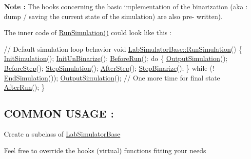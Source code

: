 {\bfseries Note \+:} The hooks concerning the basic implementation of the binarization (aka \+: dump / saving the current state of the simulation) are also pre-\/ written).

The inner code of \hyperlink{classelps_1_1_lab_simulator_base_ab48e943c2b85b25ff96b2aab4d9aa4bd}{Run\+Simulation()} could look like this \+:


\begin{DoxyCode}
\textcolor{comment}{// Default simulation loop behavior}
\textcolor{keywordtype}{void} \hyperlink{classelps_1_1_lab_simulator_base_ab48e943c2b85b25ff96b2aab4d9aa4bd}{LabSimulatorBase::RunSimulation}()
\{
\hyperlink{classelps_1_1_lab_simulator_base_aa14aa05df8173ffd2a2e67aa25f3cea5}{InitSimulation}();
\hyperlink{classelps_1_1_lab_simulator_base_a1339bc2fd37e7a4cc5c8792f447bf348}{InitUnBinarize}();
\hyperlink{classelps_1_1_lab_simulator_base_abf0012f53b199184d9359656f2f9e4e1}{BeforeRun}();
\textcolor{keywordflow}{do}
\{
        \hyperlink{classelps_1_1_lab_simulator_base_ac0c49279bf16f19b4f8fbd856e3fc6d6}{OutputSimulation}();
        \hyperlink{classelps_1_1_lab_simulator_base_a51232753515304871678d22aea555a8b}{BeforeStep}();
        \hyperlink{classelps_1_1_lab_simulator_base_ab48b05171894c3405e6865e019774106}{StepSimulation}();
        \hyperlink{classelps_1_1_lab_simulator_base_ad00284fc35dec38e6933a37858cb72c6}{AfterStep}();
        \hyperlink{classelps_1_1_lab_simulator_base_ac1dcb0ae906c0e729a31172a02c243e2}{StepBinarize}();
\}
\textcolor{keywordflow}{while} (! \hyperlink{classelps_1_1_lab_simulator_base_ae54d693898ca10e20bb9e7e22264bab8}{EndSimulation}());
\hyperlink{classelps_1_1_lab_simulator_base_ac0c49279bf16f19b4f8fbd856e3fc6d6}{OutputSimulation}();                             \textcolor{comment}{// One more time for final state}
\hyperlink{classelps_1_1_lab_simulator_base_afbd964545df8788fe65a488e731a7d05}{AfterRun}();
\}
\end{DoxyCode}


\subsection*{C\+O\+M\+M\+O\+N U\+S\+A\+G\+E \+: }


\begin{DoxyItemize}
\item Create a subclass of \hyperlink{classelps_1_1_lab_simulator_base}{Lab\+Simulator\+Base}
\item Feel free to override the hooks (virtual) functions fitting your needs
\end{DoxyItemize}

